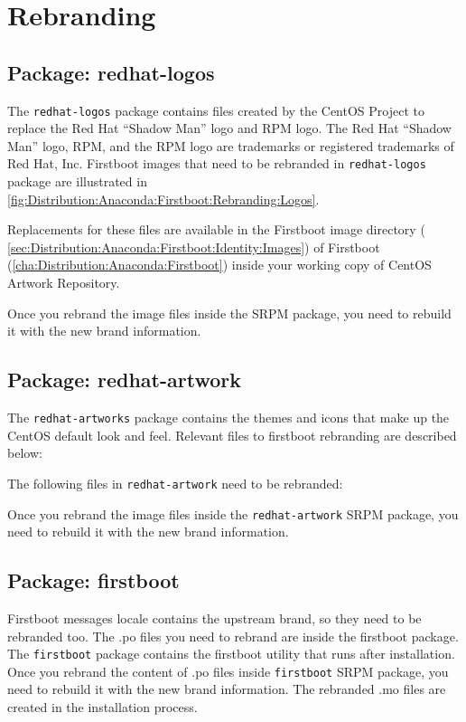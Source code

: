 \section{Rebranding}

\subsection{Package: redhat-logos}

The \texttt{redhat-logos} package contains files created by the CentOS
Project to replace the Red Hat ``Shadow Man'' logo and  RPM logo.  The
Red Hat ``Shadow Man'' logo, RPM, and the RPM logo are trademarks or
registered trademarks of Red Hat, Inc. Firstboot images that need to
be rebranded in \texttt{redhat-logos} package are illustrated in
\autoref{fig:Distribution:Anaconda:Firstboot:Rebranding:Logos}.

Replacements for these files are available in the Firstboot image
directory (
\autoref{sec:Distribution:Anaconda:Firstboot:Identity:Images}) of
Firstboot (\autoref{cha:Distribution:Anaconda:Firstboot}) inside your
working copy of CentOS Artwork Repository.

Once you rebrand the image files inside the SRPM package, you need to
rebuild it with the new brand information.

\subsection{Package: redhat-artwork}

The \texttt{redhat-artworks} package contains the themes and icons
that make up the CentOS default look and feel.  Relevant files to
firstboot rebranding are described below:

The following files in \texttt{redhat-artwork} need to be rebranded:

Once you rebrand the image files inside the \texttt{redhat-artwork}
SRPM package, you need to rebuild it with the new brand information.

\subsection{Package: firstboot}

Firstboot messages locale contains the upstream brand, so they need to
be rebranded too. The .po files you need to rebrand are inside the
firstboot package.  The \texttt{firstboot} package contains the
firstboot utility that runs after installation.  Once you rebrand the
content of .po files inside \texttt{firstboot} SRPM package, you need
to rebuild it with the new brand information.  The rebranded .mo files
are created in the installation process.

